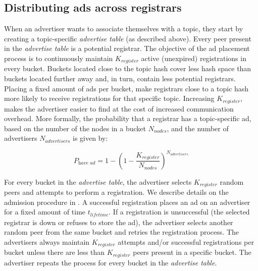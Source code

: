 \subsection{Distributing ads across registrars}\label{sec:registration_multi}
When an advertiser wants to associate themselves with a topic, they start by creating a topic-specific \emph{advertise table} (as described above). 
Every peer present in the \emph{advertise table} is a potential registrar. 
The objective of the ad placement process is to continuously maintain $K_\textit{register}$ active (\ie unexpired) registrations in every bucket. 
Buckets located close to the topic hash cover less hash space than buckets located further away and, in turn, contain less potential registrars. 
Placing a fixed amount of ads per bucket, make registrars close to a topic hash more likely to receive registrations for that specific topic. 
Increasing $K_\textit{register}$, makes the advertiser easier to find at the cost of increased communication overhead. More formally, the probability that a registrar has a topic-specific ad, based on the number of the nodes in a bucket $N_\textit{nodes}$, and the number of advertisers $N_\textit{advertisers}$ is given by:

\begin{equation}
    P_\textit{have ad} = 1-(1 - \frac{K_\textit{register}}{N_\textit{nodes}})^{N_\textit{advertisers}}
\end{equation}

For every bucket in the \emph{advertise table}, the advertiser selects
$K_{register}$ random peers and attempts to perform a registration.
We describe details on the admission procedure in . 
A successful registration places an ad on an advertiser for a fixed amount of time $t_\textit{lifetime}$.
If a registration is unsuccessful (the selected registrar is down or refuses to store the ad), the advertiser selects another random peer from the same bucket and retries the registration process. 
The advertisers always maintain $K_\textit{register}$ attempts and/or
successful registrations per bucket unless there are less than $K_\textit{register}$ peers present in a specific bucket.
The advertiser repeats the process for every bucket in the \emph{advertise table}. 

